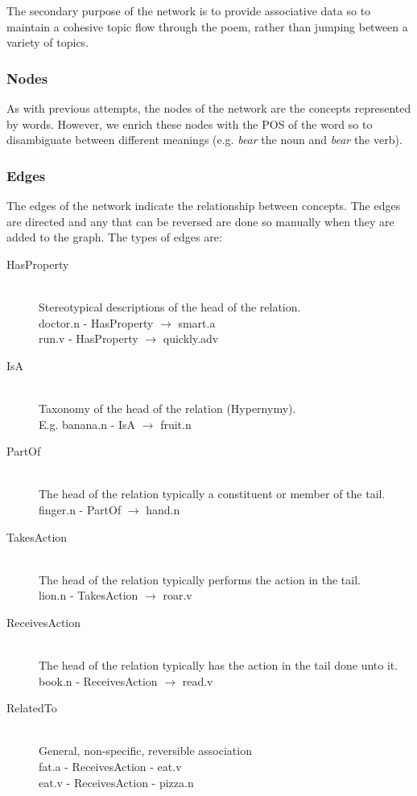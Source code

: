 The secondary purpose of the network is to provide associative data so to maintain a cohesive topic flow through the poem, rather than jumping between a variety of topics. 

\subsubsection{Nodes}
As with previous attempts, the nodes of the network are the concepts represented by words. However, we enrich these nodes with the POS of the word so to disambiguate between different meanings (e.g. \textit{bear} the noun and \textit{bear} the verb).

\subsubsection{Edges}
The edges of the network indicate the relationship between concepts. The edges are directed and any that can be reversed are done so manually when they are added to the graph. The types of edges are:
\begin{description}
\item[HasProperty] \hfill \\ Stereotypical descriptions of the head of the relation. \hfill \\ doctor.n - HasProperty $\rightarrow$ smart.a \hfill \\ run.v - HasProperty $\rightarrow$ quickly.adv
\item[IsA] \hfill \\ Taxonomy of the head of the relation (Hypernymy). \hfill \\ E.g. banana.n - IsA $\rightarrow$ fruit.n
\item[PartOf] \hfill \\ The head of the relation typically a constituent or member of the tail.  \hfill \\ finger.n - PartOf $\rightarrow$ hand.n
\item[TakesAction] \hfill \\The head of the relation typically performs the action in the tail. \hfill \\ lion.n - TakesAction $\rightarrow$ roar.v
\item[ReceivesAction] \hfill \\The head of the relation typically has the action in the tail done unto it. \hfill \\ book.n - ReceivesAction $\rightarrow$ read.v
\item[RelatedTo] \hfill \\ General, non-specific, reversible association \hfill \\ fat.a - ReceivesAction - eat.v \hfill \\ eat.v - ReceivesAction - pizza.n
\end{description}

